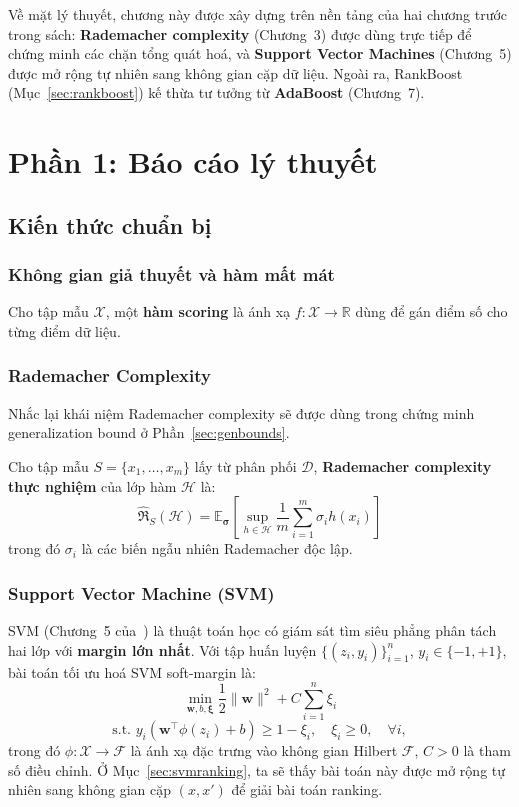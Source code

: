 Về mặt lý thuyết, chương này được xây dựng trên nền tảng của hai 
chương trước trong sách: \textbf{Rademacher complexity} (Chương~3) 
được dùng trực tiếp để chứng minh các chặn tổng quát hoá, và 
\textbf{Support Vector Machines} (Chương~5) được mở rộng tự nhiên 
sang không gian cặp dữ liệu. Ngoài ra, RankBoost (Mục~\ref{sec:rankboost}) 
kế thừa tư tưởng từ \textbf{AdaBoost} (Chương~7).

\section{Phần 1: Báo cáo lý thuyết}

\subsection{Kiến thức chuẩn bị}

\subsubsection{Không gian giả thuyết và hàm mất mát}
\begin{definition}
Cho tập mẫu $\mathcal{X}$, một \textbf{hàm scoring} là ánh xạ 
$f: \mathcal{X} \to \mathbb{R}$ 
dùng để gán điểm số cho từng điểm dữ liệu.
\end{definition}

\subsubsection{Rademacher Complexity}
Nhắc lại khái niệm Rademacher complexity sẽ được dùng 
trong chứng minh generalization bound ở Phần~\ref{sec:genbounds}.

\begin{definition}
Cho tập mẫu $S = \{x_1, \ldots, x_m\}$ lấy từ phân phối $\mathcal{D}$,
\textbf{Rademacher complexity thực nghiệm} của lớp hàm $\mathcal{H}$ là:
\[
\hat{\mathfrak{R}}_S(\mathcal{H}) = 
\mathbb{E}_{\boldsymbol{\sigma}}\left[
  \sup_{h \in \mathcal{H}} \frac{1}{m} \sum_{i=1}^{m} \sigma_i h(x_i)
\right]
\]
trong đó $\sigma_i$ là các biến ngẫu nhiên Rademacher độc lập.
\end{definition}

\subsubsection{Support Vector Machine (SVM)}

SVM (Chương~5 của~\cite{mohri2018foundations}) là thuật toán học 
có giám sát tìm siêu phẳng phân tách hai lớp với \textbf{margin 
lớn nhất}. Với tập huấn luyện $\{(z_i, y_i)\}_{i=1}^n$, 
$y_i \in \{-1,+1\}$, bài toán tối ưu hoá SVM soft-margin là:
\[
  \min_{\mathbf{w}, b, \boldsymbol{\xi}} 
  \frac{1}{2}\|\mathbf{w}\|^2 + C\sum_{i=1}^n \xi_i
\]
\[
  \text{s.t. } y_i(\mathbf{w}^\top \phi(z_i) + b) \geq 1 - \xi_i, 
  \quad \xi_i \geq 0, \quad \forall i,
\]
trong đó $\phi: \mathcal{X} \to \mathcal{F}$ là ánh xạ đặc trưng 
vào không gian Hilbert $\mathcal{F}$, $C > 0$ là tham số điều chỉnh. 
Ở Mục~\ref{sec:svmranking}, ta sẽ thấy bài toán này được mở rộng 
tự nhiên sang không gian cặp $(x, x')$ để giải bài toán ranking.

